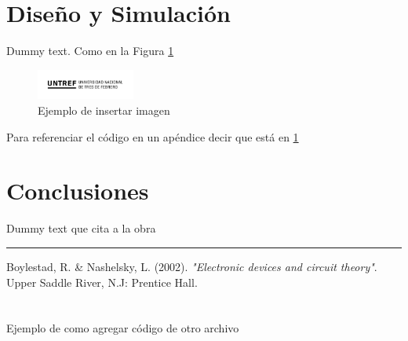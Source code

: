 \documentclass{article}
\begin{document}
\section*{Diseño y Simulación}
Dummy text. Como en la Figura \ref{imagen}

\begin{figure}[h]
    \centering
    \includegraphics[height=1cm]{logo.png}
    \caption{Ejemplo de insertar imagen}
    \label{imagen}
\end{figure}

Para referenciar el código en un apéndice decir que está en \ref{codigo}

\section*{Conclusiones}
Dummy text que cita a la obra \cite{boylestad}

\noindent\rule{\textwidth}{1pt}

\begin{thebibliography}{9}

Boylestad, R. \& Nashelsky, L. (2002). 
\textit{"Electronic devices and circuit theory"}.
Upper Saddle River, N.J: Prentice Hall.

\end{thebibliography}

\appendix

\section{}\label{codigo}
Ejemplo de como agregar código de otro archivo



\newpage
\section{}
\end{document}

